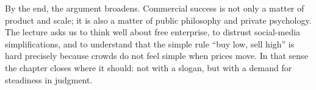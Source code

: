 By the end, the argument broadens. Commercial success is not only a matter of product and scale; it is also a matter of public philosophy and private psychology. The lecture asks us to think well about free enterprise, to distrust social-media simplifications, and to understand that the simple rule ``buy low, sell high'' is hard precisely because crowds do not feel simple when prices move. In that sense the chapter closes where it should: not with a slogan, but with a demand for steadiness in judgment.